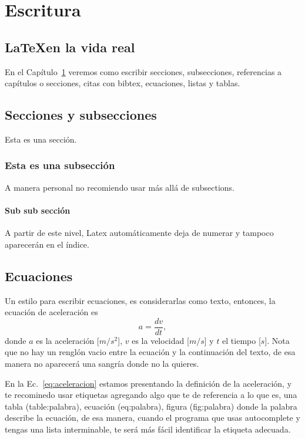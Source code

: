 \chapter{Escritura}
\label{chap:escritura}


\section{\LaTeX en la vida real}



En el Capítulo~\ref{chap:escritura} veremos como escribir secciones, subsecciones,  referencias a capítulos o secciones, citas con bibtex, ecuaciones, listas y tablas.

\section{Secciones y subsecciones}
\label{sec:secciones}

Esta es una sección.
\subsection{Esta es una subsección}
 A manera personal no recomiendo usar más allá de subsections.

\subsubsection{Sub sub sección}
A partir de este nivel, Latex automáticamente deja de numerar y tampoco aparecerán en el índice.



\section{Ecuaciones}

Un estilo para escribir ecuaciones, es considerarlas como texto, entonces, la ecuación de aceleración es
\begin{equation}
a  = \frac{dv}{dt},
\label{eq:aceleracion}
\end{equation}
donde $a$ es la aceleración [$m/s^2$], $v$ es la velocidad [$m/s$] y $t$ el tiempo [$s$]. Nota que no hay un renglón vacio entre la ecuación y la continuación del texto, de esa manera no aparecerá una sangría donde no la quieres.

En la Ec.~\ref{eq:aceleracion} estamos presentando la definición de la aceleración, y te recominedo usar etiquetas agregando algo que te de referencia a lo que es, una tabla (table:palabra), ecuación (eq:palabra), figura (fig:palabra) donde la palabra describe la ecuación, de esa manera, cuando el programa que usas autocomplete y tengas una lista interminable, te será más fácil identificar la etiqueta adecuada.


